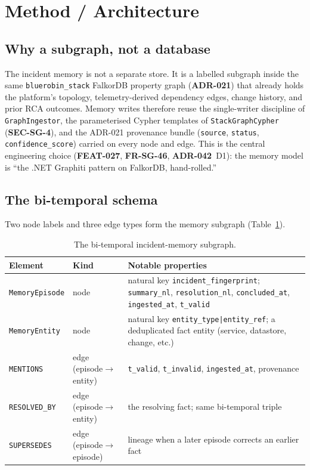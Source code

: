 \documentclass[11pt]{article}
\begin{document}
\section{Method / Architecture}

\subsection{Why a subgraph, not a database}

The incident memory is not a separate store. It is a labelled subgraph inside the
same \texttt{bluerobin\_stack} FalkorDB property graph (\textbf{ADR-021}) that
already holds the platform's topology, telemetry-derived dependency edges, change
history, and prior RCA outcomes. Memory writes therefore reuse the single-writer
discipline of \texttt{GraphIngestor}, the parameterised Cypher templates of
\texttt{StackGraphCypher} (\textbf{SEC-SG-4}), and the ADR-021 provenance bundle
(\texttt{source}, \texttt{status}, \texttt{confidence\_score}) carried on every
node and edge. This is the central engineering choice (\textbf{FEAT-027},
\textbf{FR-SG-46}, \textbf{ADR-042}~D1): the memory model is ``the .NET Graphiti
pattern on FalkorDB, hand-rolled.''

\subsection{The bi-temporal schema}

Two node labels and three edge types form the memory subgraph
(Table~\ref{tab:schema}).

\begin{table}[ht]
\centering
\caption{The bi-temporal incident-memory subgraph.}
\label{tab:schema}
\begin{tabular}{llp{5.2cm}}
\toprule
Element & Kind & Notable properties \\
\midrule
\texttt{MemoryEpisode} & node & natural key \texttt{incident\_fingerprint}; \texttt{summary\_nl}, \texttt{resolution\_nl}, \texttt{concluded\_at}, \texttt{ingested\_at}, \texttt{t\_valid} \\
\texttt{MemoryEntity}  & node & natural key \texttt{entity\_type|entity\_ref}; a deduplicated fact entity (service, datastore, change, etc.) \\
\texttt{MENTIONS}      & edge (episode$\to$entity) & \texttt{t\_valid}, \texttt{t\_invalid}, \texttt{ingested\_at}, provenance \\
\texttt{RESOLVED\_BY}  & edge (episode$\to$entity) & the resolving fact; same bi-temporal triple \\
\texttt{SUPERSEDES}    & edge (episode$\to$episode) & lineage when a later episode corrects an earlier fact \\
\bottomrule
\end{tabular}
\end{table}
\end{document}
